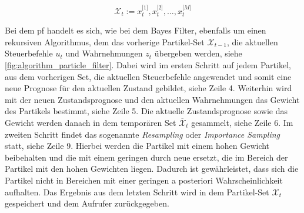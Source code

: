 \begin{equation}
\mathcal{X}_t := x^{\lbrack 1 \rbrack}_t, x^{\lbrack 2 \rbrack}_t, \ldots, x^{\lbrack M \rbrack}_t \label{eq:particle_filter_particle_set}
\end{equation}

Bei dem \Gls{pf} handelt es sich, wie bei dem Bayes Filter, ebenfalls um einen rekursiven Algorithmus, dem das vorherige Partikel-Set $\mathcal{X}_{t-1}$, die aktuellen Steuerbefehle $u_t$ und Wahrnehmungen $z_t$ übergeben werden, siehe \autoref{fig:algorithm_particle_filter}. Dabei wird im ersten Schritt auf jedem Partikel, aus dem vorherigen Set, die aktuellen Steuerbefehle angewendet und somit eine neue Prognose für den aktuellen Zustand gebildet, siehe Zeile 4. Weiterhin wird mit der neuen Zustandsprognose und den aktuellen Wahrnehmungen das Gewicht des Partikels bestimmt, siehe Zeile 5. Die aktuelle Zustandsprognose sowie das Gewicht werden danach in dem temporären Set $\overline{\mathcal{X}}_t$ gesammelt, siehe Zeile 6. Im zweiten Schritt findet das sogenannte \textit{Resampling} oder \textit{Importance Sampling} statt, siehe Zeile 9. Hierbei werden die Partikel mit einem hohen Gewicht beibehalten und die mit einem geringen durch neue ersetzt, die im Bereich der Partikel mit den hohen Gewichten liegen. Dadurch ist gewährleistet, dass sich die Partikel nicht in Bereichen mit einer geringen a posteriori Wahrscheinlichkeit aufhalten. Das Ergebnis aus dem letzten Schritt wird in dem Partikel-Set $\mathcal{X}_t$ gespeichert und dem Aufrufer zurückgegeben.

\begin{figure}
	\centering
	\label{fig:algorithm_particle_filter}
\end{figure}


%
%
\subsection{}


